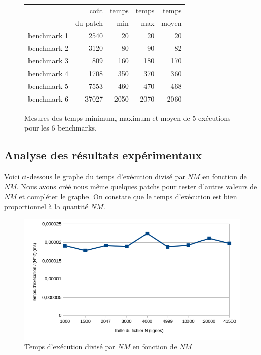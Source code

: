 \documentclass[a4paper, 10pt, french]{article}
\begin{document}
    \begin{figure}[h!]
      \begin{center}
        \begin{tabular}{|l||r||r|r|r||}
          \hline
          \hline
            & coût         & temps     & temps   & temps \\
            & du patch     & min       & max     & moyen \\
          \hline
          \hline
            benchmark 1 & 2540 & 20 & 20 & 20 \\
          \hline
            benchmark 2 & 3120 & 80 & 90 & 82 \\
          \hline
            benchmark 3 & 809 & 160 & 180 & 170 \\
          \hline
            benchmark 4 & 1708 & 350 & 370 & 360 \\
          \hline
            benchmark 5 & 7553 & 460 & 470 & 468 \\
          \hline
            benchmark 6 & 37027 & 2050 & 2070 & 2060 \\
          \hline
          \hline
        \end{tabular}
        \caption{Mesures des temps minimum, maximum et moyen de 5 exécutions pour les 6 benchmarks.}
        \label{table-temps}
      \end{center}
    \end{figure}

\subsection{Analyse des résultats expérimentaux}

Voici ci-dessous le graphe du temps d'exécution divisé par $NM$ en fonction de $NM$.
Nous avons créé nous même quelques patchs pour tester d'autres valeurs de $NM$ et compléter le graphe.
On constate que le temps d'exécution est bien proportionnel à la quantité $NM$.


\begin{figure}[h!]
\begin{center}
\includegraphics[width=12cm]{exec.png}
\caption{Temps d'exécution divisé par $NM$ en fonction de $NM$}
\end{center}
\end{figure}
\end{document}
